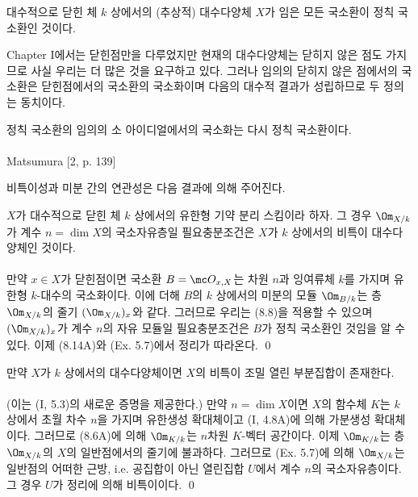 	
	\begin{definition}
	대수적으로 닫힌 체 $k$ 상에서의 (추상적) 대수다양체 $X$가 임은 모든 국소환이 정칙 국소환인 것이다.
	\end{definition}
	
	Chapter I에서는 닫힌점만을 다루었지만 현재의 대수다양체는 닫히지 않은 점도 가지므로 사실 우리는 더 많은 것을 요구하고 있다.
	그러나 임의의 닫히지 않은 점에서의 국소환은 닫힌점에서의 국소환의 국소화이며 다음의 대수적 결과가 성립하므로 두 정의는 동치이다.
	
	
	\begin{theorema}
	정칙 국소환의 임의의 소 아이디얼에서의 국소화는 다시 정칙 국소환이다.\\\\
	\pf Matsumura [2, p. 139]
	\end{theorema}
	
	비특이성과 미분 간의 연관성은 다음 결과에 의해 주어진다.
	
	
	\begin{theorem}
	$X$가 대수적으로 닫힌 체 $k$ 상에서의 유한형 기약 분리 스킴이라 하자.
	그 경우 $\Om_{X/k}$가 계수 $n=\dim X$의 국소자유층일 필요충분조건은 $X$가 $k$ 상에서의 비특이 대수다양체인 것이다.\\\\
	\pf 만약 $x\in X$가 닫힌점이면 국소환 $B=\mc O_{x,X}$는 차원 $n$과 잉여류체 $k$를 가지며 유한형 $k$-대수의 국소화이다.
	이에 더해 $B$의 $k$ 상에서의 미분의 모듈 $\Om_{B/k}$는 층 $\Om_{X/k}$의 줄기 $(\Om_{X/k})_x$와 같다.
	그러므로 우리는 (8.8)을 적용할 수 있으며 $(\Om_{X/k})_x$가 계수 $n$의 자유 모듈일 필요충분조건은 $B$가 정칙 국소환인 것임을 알 수 있다.
	이제 (8.14A)와 (Ex. 5.7)에서 정리가 따라온다.
	\qed
	\end{theorem}
	
	
	\begin{corollary}
	만약 $X$가 $k$ 상에서의 대수다양체이면 $X$의 비특이 조밀 열린 부분집합이 존재한다.\\\\
	\pf (이는 (I, 5.3)의 새로운 증명을 제공한다.) 만약 $n=\dim X$이면 $X$의 함수체 $K$는 $k$ 상에서 초월 차수 $n$을 가지며
	유한생성 확대체이고 (I, 4.8A)에 의해 가분생성 확대체이다.
	그러므로 (8.6A)에 의해 $\Om_{K/k}$는 $n$차원 $K$-벡터 공간이다. 이제 $\Om_{K/k}$는 층 $\Om_{X/k}$의 $X$의 일반점에서의 줄기에 불과하다.
	그러므로 (Ex. 5.7)에 의해 $\Om_{X/k}$는 일반점의 어떠한 근방, i.e. 공집합이 아닌 열린집합 $U$에서 계수 $n$의 국소자유층이다.
	그 경우 $U$가 정리에 의해 비특이이다.
	\qed
	\end{corollary}
	
